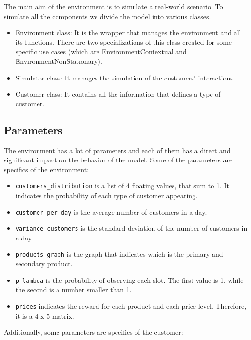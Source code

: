 The main aim of the environment is to simulate a real-world scenario. To simulate all the components we divide the model into various classes.
\begin{itemize}
    \item Environment class: It is the wrapper that manages the environment and all its functions. There are two specializations of this class created for some specific use cases (which are EnvironmentContextual and EnvironmentNonStationary).
    \item Simulator class: It manages the simulation of the customers' interactions.
    \item Customer class: It contains all the information that defines a type of customer.
\end{itemize}

\subsection{Parameters}
The environment has a lot of parameters and each of them has a direct and significant impact on the behavior of the model.
Some of the parameters are specifics of the environment:
\begin{itemize}
  \item \verb|customers_distribution| is a list of 4 floating values, that sum to 1. It indicates the probability of each type of customer appearing.
  \item \verb|customer_per_day| is the average number of customers in a day.
  \item \verb|variance_customers| is the standard deviation of the number of customers in a day.
  \item \verb|products_graph| is the graph that indicates which is the primary and secondary product.
  \item \verb|p_lambda| is the probability of observing each slot. The first value is 1, while the second is a number smaller than 1.
  \item \verb|prices| indicates the reward for each product and each price level. Therefore, it is a 4 x 5 matrix.
\end{itemize}
Additionally, some parameters are specifics of the customer:
